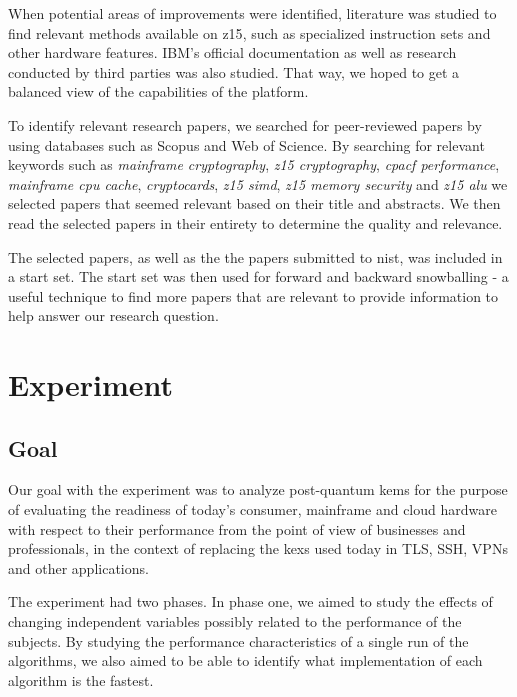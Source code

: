 When potential areas of improvements were identified, literature was studied to find relevant methods available on \gls{z15}, such as specialized instruction sets and other hardware features. IBM's official documentation as well as research conducted by third parties was also studied. That way, we hoped to get a balanced view of the capabilities of the platform.

To identify relevant research papers, we searched for peer-reviewed papers by using databases such as Scopus and Web of Science. By searching for relevant keywords such as \textit{mainframe cryptography}, \textit{z15 cryptography}, \textit{cpacf performance}, \textit{mainframe cpu cache}, \textit{cryptocards}, \textit{z15 simd}, \textit{z15 memory security} and \textit{z15 alu} we selected papers that seemed relevant based on their title and abstracts. We then read the selected papers in their entirety to determine the quality and relevance.

The selected papers, as well as the the papers submitted to \gls{nist}, was included in a start set. The start set was then used for forward and backward snowballing - a useful technique to find more papers that are relevant to provide information to help answer our research question\cite{wohlin2014}.

\section{Experiment}
\label{section:method:experiment}

\subsection{Goal}
\label{section:method:experiment:goal}

Our goal with the experiment was to analyze \gls{post-quantum} \glspl{kem} for the purpose of evaluating the readiness of today's consumer, mainframe and cloud hardware with respect to their performance from the point of view of businesses and professionals, in the context of replacing the \glspl{kex} used today in TLS, SSH, VPNs and other applications.

The experiment had two phases. In phase one, we aimed to study the effects of changing independent variables possibly related to the performance of the subjects. By studying the performance characteristics of a single run of the algorithms, we also aimed to be able to identify what implementation of each algorithm is the fastest.

